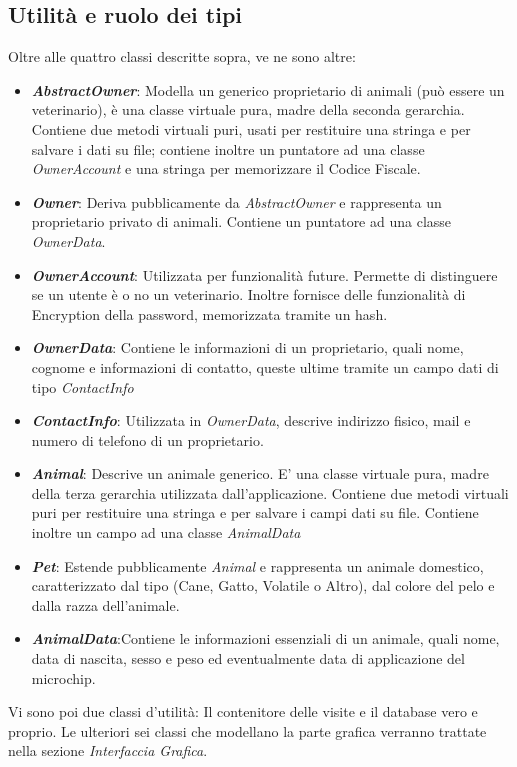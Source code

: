 \subsection{Utilità e ruolo dei tipi}
 Oltre alle quattro classi descritte sopra, ve ne sono altre:
 \begin{itemize}
 	\item \textit{\textbf{AbstractOwner}}: Modella un generico proprietario di animali (può essere un veterinario), è una classe virtuale pura, madre della seconda gerarchia. Contiene due metodi virtuali puri, usati per restituire una stringa e per salvare i dati su file; contiene inoltre un puntatore ad una classe \textit{OwnerAccount} e una stringa per memorizzare il Codice Fiscale.
 	\item \textit{\textbf{Owner}}: Deriva pubblicamente da \textit{AbstractOwner} e rappresenta un proprietario privato di animali. Contiene un puntatore ad una classe \textit{OwnerData}.
 	\item \textit{\textbf{OwnerAccount}}: Utilizzata per funzionalità future. Permette di distinguere se un utente è o no un veterinario. Inoltre fornisce delle funzionalità di Encryption della password, memorizzata tramite un hash.
 	\item \textit{\textbf{OwnerData}}: Contiene le informazioni di un proprietario, quali nome, cognome e informazioni di contatto, queste ultime tramite un campo dati di tipo \textit{ContactInfo}
 	\item \textit{\textbf{ContactInfo}}: Utilizzata in \textit{OwnerData}, descrive indirizzo fisico, mail e numero di telefono di un proprietario.
 	\item \textit{\textbf{Animal}}: Descrive un animale generico. E' una classe virtuale pura, madre della terza gerarchia utilizzata dall'applicazione.
 	Contiene due metodi virtuali puri per restituire una stringa e per salvare i campi dati su file. Contiene inoltre un campo ad una classe \textit{AnimalData}
 	\item \textit{\textbf{Pet}}: Estende pubblicamente \textit{Animal} e rappresenta un animale domestico, caratterizzato dal tipo (Cane, Gatto, Volatile o Altro), dal colore del pelo e dalla razza dell'animale.
 	\item \textit{\textbf{AnimalData}}:Contiene le informazioni essenziali di un animale, quali nome, data di nascita, sesso e peso ed eventualmente data di applicazione del microchip.
 \end{itemize}
 
 Vi sono poi due classi d'utilità: Il contenitore delle visite e il database vero e proprio. Le ulteriori sei classi che modellano la parte grafica verranno trattate nella sezione \textit{Interfaccia Grafica}.
 

